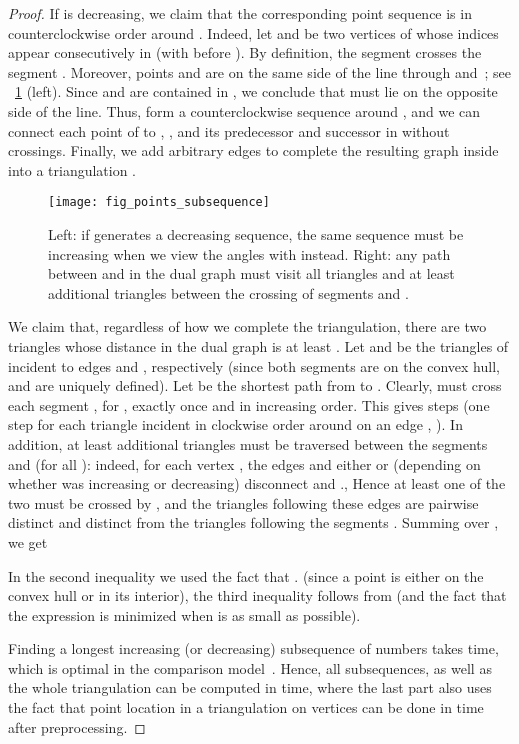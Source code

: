 \documentclass{article}
\begin{document}
\begin{proof}
If  is decreasing, we claim that the corresponding point 
sequence is in counterclockwise order around .
Indeed, let  and  be two vertices of  whose indices appear 
consecutively in  (with  before ). By definition, the 
segment  crosses the segment . Moreover, points  and 
 are on the same side of the line through  and~; see \figurename~\ref{fig:fig_points_subsequence} (left). Since 
 and  are contained in , we conclude that  
must lie on the opposite side of the line. Thus,  form a 
counterclockwise sequence around , and
we can connect each point of  to , , and its 
predecessor and successor in  without crossings.
Finally, we add arbitrary edges to complete the resulting graph inside 
 into a triangulation .
\begin{figure}[tb]
\centering
\texttt{[image: fig\_points\_subsequence]}
\caption{Left: if  generates a decreasing sequence, the same sequence must be increasing when we view the angles with  instead.
Right: any path between  and  in the dual graph must visit all triangles  and at least  additional triangles between the crossing of segments  and .}
\label{fig:fig_points_subsequence}
\end{figure}

 We claim that, regardless of how we complete the triangulation, there 
 are two triangles whose distance in the dual graph is at least 
 . 
Let  and  be the triangles of  incident to edges  
and , respectively (since both segments are on the convex hull, 
 and  are uniquely defined). Let  be the shortest path from
 to . Clearly,  must cross each segment , for 
, exactly once and in increasing order.
This gives  steps (one step for each triangle 
incident in clockwise order around  on an edge 
, ).
In addition, 
at least  additional triangles must be traversed 
between the 
segments  and  (for all ): 
indeed, for each vertex , the edges 
 and either  or  (depending on whether  
was increasing or decreasing) disconnect  and .,
Hence at least one 
of the two must be crossed by , and the triangles following these
edges are pairwise distinct and distinct from the triangles following
the segments .
Summing over , we get

In the second inequality we used the fact that 
. (since a point is 
either on the convex hull or in its interior), the third inequality follows from  (and the fact that the expression is minimized when  is as small as possible). 

Finding a longest increasing (or decreasing) subsequence of  numbers 
takes  time, which is optimal in the comparison 
model~\cite{fredman}.
Hence, all subsequences, as well as the whole triangulation can 
be computed in  time,
where the last part also uses the fact that point location in a triangulation 
on  vertices can be done in  time after 
 preprocessing.
\end{proof}
\end{document}
